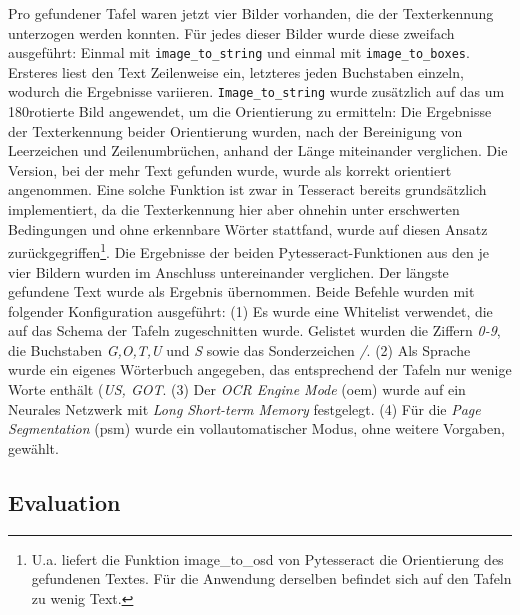 Pro gefundener Tafel waren jetzt vier Bilder vorhanden, die der Texterkennung unterzogen werden konnten. Für jedes dieser Bilder wurde diese zweifach ausgeführt: Einmal mit \verb|image_to_string| und einmal mit \verb|image_to_boxes|. Ersteres liest den Text Zeilenweise ein, letzteres jeden Buchstaben einzeln, wodurch die Ergebnisse variieren. \verb|Image_to_string| wurde zusätzlich auf das um 180\degree rotierte Bild angewendet, um die Orientierung zu ermitteln: Die Ergebnisse der Texterkennung beider Orientierung wurden, nach der Bereinigung von Leerzeichen und Zeilenumbrüchen, anhand der Länge miteinander verglichen. Die Version, bei der mehr Text gefunden wurde, wurde als korrekt orientiert angenommen. Eine solche Funktion ist zwar in Tesseract bereits grundsätzlich implementiert, da die Texterkennung hier aber ohnehin unter erschwerten Bedingungen und ohne erkennbare Wörter stattfand, wurde auf diesen Ansatz zurückgegriffen\footnote{U.a. liefert die Funktion image\_to\_osd von Pytesseract die Orientierung des gefundenen Textes. Für die Anwendung derselben befindet sich auf den Tafeln zu wenig Text.}.
Die Ergebnisse der beiden Pytesseract-Funktionen aus den je vier Bildern wurden im Anschluss untereinander verglichen. Der längste gefundene Text wurde als Ergebnis übernommen.
Beide Befehle wurden mit folgender Konfiguration ausgeführt: (1) Es wurde eine Whitelist verwendet, die auf das Schema der Tafeln zugeschnitten wurde. Gelistet wurden die Ziffern \textit{0-9}, die Buchstaben \textit{G,O,T,U} und \textit{S} sowie das Sonderzeichen \textit{/}. (2) Als Sprache wurde ein eigenes Wörterbuch angegeben, das entsprechend der Tafeln nur wenige Worte enthält (\textit{US, GOT}. (3) Der \textit{OCR Engine Mode} (oem) wurde auf ein Neurales Netzwerk mit \textit{Long Short-term Memory}\cite{hochreitersepp} festgelegt. (4) Für die \textit{Page Segmentation} (psm) wurde ein vollautomatischer Modus, ohne weitere Vorgaben, gewählt.


\subsection{Evaluation}

